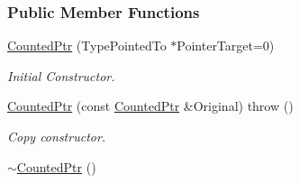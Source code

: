 \subsubsection*{Public Member Functions}
\begin{DoxyCompactItemize}
\item 
\hyperlink{classMezzanine_1_1CountedPtr_ab53831e2af99d19396cfab5016c640bd}{CountedPtr} (TypePointedTo $\ast$PointerTarget=0)
\begin{DoxyCompactList}\small\item\em Initial Constructor. \item\end{DoxyCompactList}\item 
\hyperlink{classMezzanine_1_1CountedPtr_a6cfa958ec832f805959518cb9eeb8302}{CountedPtr} (const \hyperlink{classMezzanine_1_1CountedPtr}{CountedPtr} \&Original)  throw ()
\begin{DoxyCompactList}\small\item\em Copy constructor. \item\end{DoxyCompactList}\item 
\hypertarget{classMezzanine_1_1CountedPtr_a8f9ed87946e558881b33070519764240}{
\hyperlink{classMezzanine_1_1CountedPtr_a8f9ed87946e558881b33070519764240}{$\sim$CountedPtr} ()}
\label{classMezzanine_1_1CountedPtr_a8f9ed87946e558881b33070519764240}


\end{DoxyCompactItemize}
